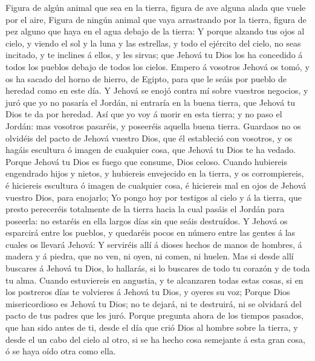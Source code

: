  Figura de algún animal que sea en la tierra, figura de ave
alguna alada que vuele por el aire,  Figura de ningún
animal que vaya arrastrando por la tierra, figura de pez alguno que haya
en el agua debajo de la tierra:  Y porque alzando tus ojos
al cielo, y viendo el sol y la luna y las estrellas, y todo el ejército
del cielo, no seas incitado, y te inclines á ellos, y les sirvas; que
Jehová tu Dios los ha concedido á todos los pueblos debajo de todos los
cielos.  Empero á vosotros Jehová os tomó, y os ha sacado
del horno de hierro, de Egipto, para que le seáis por pueblo de heredad
como en este día.  Y Jehová se enojó contra mí sobre
vuestros negocios, y juró que yo no pasaría el Jordán, ni entraría en la
buena tierra, que Jehová tu Dios te da por heredad.  Así
que yo voy á morir en esta tierra; y no paso el Jordán: mas vosotros
pasaréis, y poseeréis aquella buena tierra.  Guardaos no os
olvidéis del pacto de Jehová vuestro Dios, que él estableció con
vosotros, y os hagáis escultura ó imagen de cualquier cosa, que Jehová
tu Dios te ha vedado.  Porque Jehová tu Dios es fuego que
consume, Dios celoso.  Cuando hubiereis engendrado hijos y
nietos, y hubiereis envejecido en la tierra, y os corrompiereis, é
hiciereis escultura ó imagen de cualquier cosa, é hiciereis mal en ojos
de Jehová vuestro Dios, para enojarlo;  Yo pongo hoy por
testigos al cielo y á la tierra, que presto pereceréis totalmente de la
tierra hacia la cual pasáis el Jordán para poseerla: no estaréis en ella
largos días sin que seáis destruídos.  Y Jehová os
esparcirá entre los pueblos, y quedaréis pocos en número entre las
gentes á las cuales os llevará Jehová:  Y serviréis allí á
dioses hechos de manos de hombres, á madera y á piedra, que no ven, ni
oyen, ni comen, ni huelen.  Mas si desde allí buscares á
Jehová tu Dios, lo hallarás, si lo buscares de todo tu corazón y de toda
tu alma.  Cuando estuviereis en angustia, y te alcanzaren
todas estas cosas, si en los postreros días te volvieres á Jehová tu
Dios, y oyeres su voz;  Porque Dios misericordioso es
Jehová tu Dios; no te dejará, ni te destruirá, ni se olvidará del pacto
de tus padres que les juró.  Porque pregunta ahora de los
tiempos pasados, que han sido antes de ti, desde el día que crió Dios al
hombre sobre la tierra, y desde el un cabo del cielo al otro, si se ha
hecho cosa semejante á esta gran cosa, ó se haya oído otra como ella.

